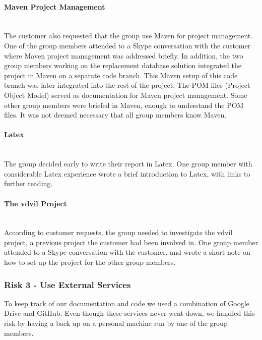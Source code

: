 \documentclass[../document]{subfiles}
\begin{document}
\paragraph{Maven Project Management} \ \\
The customer also requested that the group use Maven for project management. One of the group members attended to a Skype conversation with the customer where Maven project management was addressed briefly. In addition, the two group members working on the replacement database solution integrated the project in Maven on a separate code branch. This Maven setup of this code branch was later integrated into the rest of the project. The POM files (Project Object Model) served as documentation for Maven project management. Some other group members were briefed in Maven, enough to understand the POM files. It was not deemed necessary that all group members know Maven.

\paragraph{Latex} \ \\
The group decided early to write their report in Latex. One group member with considerable Latex experience wrote a brief introduction to Latex, with links to further reading.

\paragraph{The vdvil Project} \ \\
According to customer requests, the group needed to investigate the vdvil project, a previous project the customer had been involved in. One group member attended to a Skype conversation with the customer, and wrote a short note on how to set up the project for the other group members.


\subsubsection{Risk 3 - Use External Services}
To keep track of our documentation and code we used a combination of Google Drive and GitHub. Even though these services never went down, we handled this risk by having a back up on a personal machine run by one of the group members. 
\end{document}
